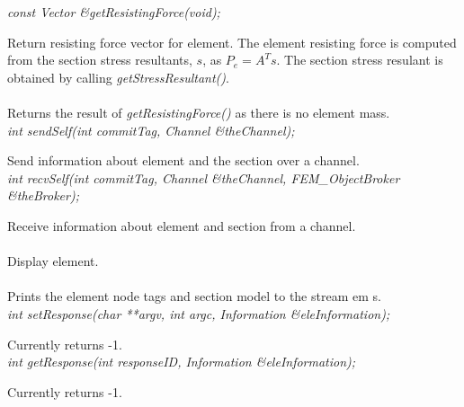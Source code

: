 {\em    const Vector \&getResistingForce(void);} 

Return resisting force vector for element.  The element resisting force is computed
from the section stress resultants, $s$, as $P_e = A^T s$.  The section
stress resulant is obtained by calling {\em getStressResultant()}.
\\

 \\            
Returns the result of {\em getResistingForce()} as there is no element mass.
\\

{\em    int sendSelf(int commitTag, Channel \&theChannel);} 

Send information about element and the section over a channel.
\\

{\em    int recvSelf(int commitTag, Channel \&theChannel, FEM\_ObjectBroker \&theBroker);} 

Receive information about element and section from a channel.
\\

 \\    
Display element.
\\

 \\    
Prints the element node tags and section model to the stream {em s}.
\\

{\em    int setResponse(char **argv, int argc, Information \&eleInformation);} 

Currently returns -1.
\\

{\em    int getResponse(int responseID, Information \&eleInformation);} 

Currently returns -1.
\\






